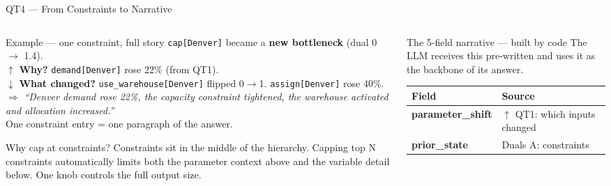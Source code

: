 \documentclass[aspectratio=169,10pt]{beamer}
\begin{document}
\begin{frame}[t]{QT4 — From Constraints to Narrative}
\vspace{2pt}
\begin{columns}[T]
  \begin{column}{0.50\textwidth}
    \begin{exampleblock}{Example — one constraint, full story}
      \small
      \texttt{cap[Denver]} became a \textbf{new bottleneck}
      (dual 0 $\to$ 1.4).\\[4pt]
      \textcolor{aorng}{$\uparrow$ \textbf{Why?}} \texttt{demand[Denver]}
      rose 22\% (from QT1).\\[4pt]
      \textcolor{purp}{$\downarrow$ \textbf{What changed?}}
      \texttt{use\_warehouse[Denver]} flipped 0$\to$1.
      \texttt{assign[Denver]} rose 40\%.\\[4pt]
      $\Rightarrow$ \emph{``Denver demand rose 22\%,
      the capacity constraint tightened, the warehouse
      activated and allocation increased.''}\\[4pt]
      \textcolor{mgray}{\scriptsize One constraint entry = one paragraph
      of the answer.}
    \end{exampleblock}
    \vspace{4pt}
    \begin{block}{Why cap at constraints?}
      \small
      Constraints sit in the middle of the hierarchy.
      Capping top N constraints automatically limits both
      the parameter context above and the variable detail
      below. One knob controls the full output size.
    \end{block}
  \end{column}
  \begin{column}{0.46\textwidth}
    \begin{block}{The 5-field narrative — built by code}
      \small The LLM receives this pre-written and uses it
      as the backbone of its answer.
      \vspace{4pt}
      \renewcommand{\arraystretch}{1.4}
      \scriptsize
      \begin{tabular}{@{}p{2.3cm}@{\ }p{3.8cm}@{}}
        \toprule
        \textbf{Field} & \textbf{Source} \\
        \midrule
        \textbf{parameter\_shift} & \textcolor{aorng}{$\uparrow$ QT1}: which
                                    inputs changed \\
        \textbf{prior\_state}     & \textcolor{ared}{Duals A}: constraints

\end{tabular}
\end{block}
\end{column}
\end{columns}
\end{frame}
\end{document}
